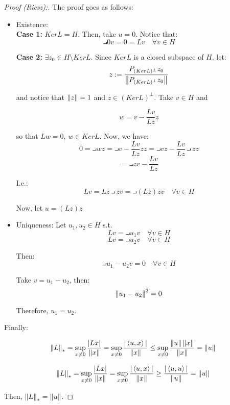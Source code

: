 \begin{proof}[Proof (Riesz):]
    The proof goes as follows:
    \begin{itemize}
        \item Existence:\\
        \textbf{Case 1:} $Ker L = H$. Then, take $u = 0$. Notice that:
        $$\intprod{0}{v} = 0 = Lv \quad \forall v \in H$$

        \textbf{Case 2:} $\exists z_0 \in H \setminus KerL$. Since $Ker L$ is a closed subspace of 
        $H$, let:
        $$z:= \frac{P_{(Ker L)^{\perp}} z_0}{\left\|P_{(Ker L)^{\perp}} z_0\right\|}$$

        and notice that $\left\|z\right\| = 1$ and $z \in (Ker L)^{\perp}$. Take $v \in H$ and 

        $$w = v - \frac{Lv}{Lz}z$$

        so that $Lw = 0$, $w \in Ker L$. Now, we have:
        $$0 = \intprod{w}{z} = \intprod{v - \frac{Lv}{Lz}z}{z} = \intprod{v}{z} - \frac{Lv}{Lz}\intprod{z}{z}$$
        $$= \intprod{z}{v} - \frac{Lv}{Lz}$$

        I.e.:
        $$Lv = Lz \intprod{z}{v} = \intprod{(Lz)z}{v} \quad \forall v \in H$$

        Now, let $u = (Lz) z$
    
        \item Uniqueness: Let $u_1, u_2 \in H$ s.t. 
        $$Lv = \intprod{u_1}{v} \quad \forall v \in H$$
        $$Lv = \intprod{u_2}{v} \quad \forall v \in H$$

        Then:
        $$\intprod{u_1 - u_2}{v} = 0 \quad \forall v \in H$$

        Take $v = u_1 - u_2$, then:
        $$\left\|u_1 - u_2\right\|^2 = 0$$

        Therefore, $u_1 = u_2$.
    \end{itemize}

    Finally:

    $$\left\|L\right\|_* = \sup_{x \neq 0} \frac{|Lx|}{\left\|x\right\|} = \sup_{x \neq 0} \frac{|\left\langle u, x \right\rangle|}{\left\|x\right\|} 
    \leq \sup_{x \neq 0} \frac{\left\|u\right\| \left\|x\right\|}{\left\|x\right\|} = \left\|u\right\|$$

    $$\left\|L\right\|_* = \sup_{x \neq 0} \frac{|Lx|}{\left\|x\right\|} = \sup_{x \neq 0} \frac{|\left\langle u, x \right\rangle|}{\left\|x\right\|} 
    \geq \frac{|\left\langle u, u \right\rangle|}{\left\|u\right\|} = \left\|u\right\|$$

    Then, $\left\|L\right\|_* = \left\|u\right\|$.

\end{proof}

